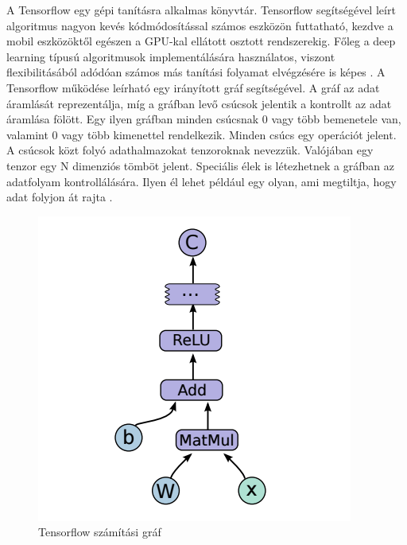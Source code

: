 \documentclass[12pt, a4paper, oneside]{book}
\theoremstyle{tetel}
\begin{document}
A Tensorflow egy gépi tanításra alkalmas könyvtár. Tensorflow segítségével leírt algoritmus nagyon kevés kódmódosítással számos eszközön futtatható, kezdve a mobil eszközöktől egészen a GPU-kal ellátott osztott rendszerekig. Főleg a deep learning típusú algoritmusok implementálására használatos, viszont flexibilitásából adódóan számos más tanítási folyamat elvégzésére is képes \cite{35}.
\newline
\indent
A Tensorflow működése leírható egy irányított gráf segítségével. A gráf az adat áramlását reprezentálja, míg a gráfban levő csúcsok jelentik a kontrollt az adat áramlása fölött. Egy ilyen gráfban minden csúcsnak 0 vagy több bemenetele van, valamint 0 vagy több kimenettel rendelkezik. Minden csúcs egy operációt jelent. A csúcsok közt folyó adathalmazokat tenzoroknak nevezzük. Valójában egy tenzor egy N dimenziós tömböt jelent. Speciális élek is létezhetnek a gráfban az adatfolyam kontrollálására. Ilyen él lehet például egy olyan, ami megtiltja, hogy adat folyjon át rajta \cite{35}.

\begin{figure}[!htbp]
	\begin{center}
		\includegraphics[scale=0.8]{tensorflow_graph.png}
		\caption{Tensorflow számítási gráf\cite{35}}
		\label{tensorflow_graph}
	\end{center}
\end{figure}
\end{document}
